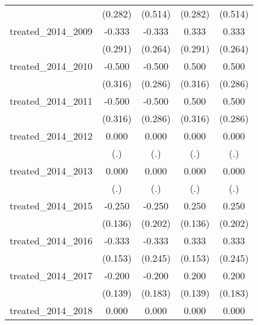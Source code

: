 {\begin{tabular}{l*{4}{c}}
            &     (0.282)         &     (0.514)         &     (0.282)         &     (0.514)         \\
[1em]
treated\_2014\_2009&      -0.333         &      -0.333         &       0.333         &       0.333         \\
            &     (0.291)         &     (0.264)         &     (0.291)         &     (0.264)         \\
[1em]
treated\_2014\_2010&      -0.500         &      -0.500         &       0.500         &       0.500         \\
            &     (0.316)         &     (0.286)         &     (0.316)         &     (0.286)         \\
[1em]
treated\_2014\_2011&      -0.500         &      -0.500         &       0.500         &       0.500         \\
            &     (0.316)         &     (0.286)         &     (0.316)         &     (0.286)         \\
[1em]
treated\_2014\_2012&       0.000         &       0.000         &       0.000         &       0.000         \\
            &         (.)         &         (.)         &         (.)         &         (.)         \\
[1em]
treated\_2014\_2013&       0.000         &       0.000         &       0.000         &       0.000         \\
            &         (.)         &         (.)         &         (.)         &         (.)         \\
[1em]
treated\_2014\_2015&      -0.250         &      -0.250         &       0.250         &       0.250         \\
            &     (0.136)         &     (0.202)         &     (0.136)         &     (0.202)         \\
[1em]
treated\_2014\_2016&      -0.333\sym{*}  &      -0.333         &       0.333\sym{*}  &       0.333         \\
            &     (0.153)         &     (0.245)         &     (0.153)         &     (0.245)         \\
[1em]
treated\_2014\_2017&      -0.200         &      -0.200         &       0.200         &       0.200         \\
            &     (0.139)         &     (0.183)         &     (0.139)         &     (0.183)         \\
[1em]
treated\_2014\_2018&       0.000         &       0.000         &       0.000         &       0.000         \\

\end{tabular}}

